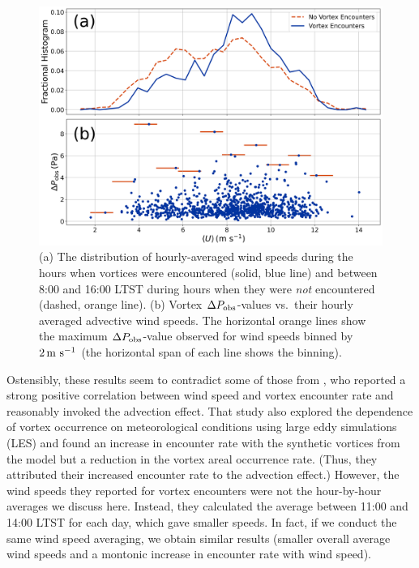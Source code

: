 \documentclass{aastex63}
\begin{document}
\begin{figure}
    \centering
    \includegraphics[width=\textwidth]{figures/U_vs_DeltaP_comparisons.png}
    \caption{(a) The distribution of hourly-averaged wind speeds during the hours when vortices were encountered (solid, blue line) and between 8:00 and 16:00 LTST during hours when they were \emph{not} encountered (dashed, orange line). (b) Vortex $\Delta P_{\rm obs}$-values vs.~their hourly averaged advective wind speeds. The horizontal orange lines show the maximum $\Delta P_{\rm obs}$-value observed for wind speeds binned by $2\, {\rm m\ s^{-1}}$ (the horizontal span of each line shows the binning).}
    \label{fig:U_vs_DeltaP_comparisons}
\end{figure}

Ostensibly, these results seem to contradict some of those from \cite{Spiga2021}, who reported a strong positive correlation between wind speed and vortex encounter rate and reasonably invoked the advection effect. That study also explored the dependence of vortex occurrence on meteorological conditions using large eddy simulations (LES) and found an increase in encounter rate with the synthetic vortices from the model but a reduction in the vortex areal occurrence rate. (Thus, they attributed their increased encounter rate to the advection effect.)
However, the wind speeds they reported for vortex encounters were not the hour-by-hour averages we discuss here. Instead, they calculated the average between 11:00 and 14:00 LTST for each day, which gave smaller speeds. In fact, if we conduct the same wind speed averaging, we obtain similar results (smaller overall average wind speeds and a montonic increase in encounter rate with wind speed). 
\end{document}
